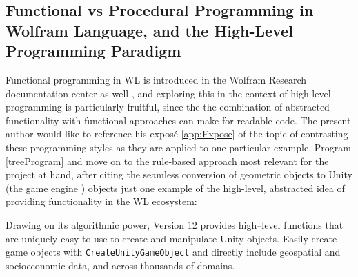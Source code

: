 \subsection{Functional vs Procedural Programming in Wolfram Language, and the High-Level Programming Paradigm} \label{high-level}

Functional programming in WL is introduced in the Wolfram Research documentation center as well \cite{noauthor_functional_nodate}, and exploring this in the context of high level programming is particularly fruitful, since the the combination of abstracted functionality with functional approaches can make for readable code. The present author would like to reference his exposé \ref{app:Expose} of the topic of contrasting these programming styles as they are applied to one particular example, Program \ref{treeProgram} and move on to the rule-based approach most relevant for the project at hand, after citing the seamless conversion of geometric objects to Unity (the game engine \cite{noauthor_real-time_nodate}) objects just one example of the high-level, abstracted idea of providing functionality in the WL ecosystem: 

\begin{center}
   \begin{displayquote}
    Drawing on its algorithmic power, Version 12 provides high–level functions that are uniquely easy to use to create and manipulate Unity objects. Easily create game objects with \lstinline+CreateUnityGameObject+ and directly include geospatial and socioeconomic data, and across thousands of domains.
    \cite{noauthor_highlevel_nodate}
    \end{displayquote} 
\end{center}

